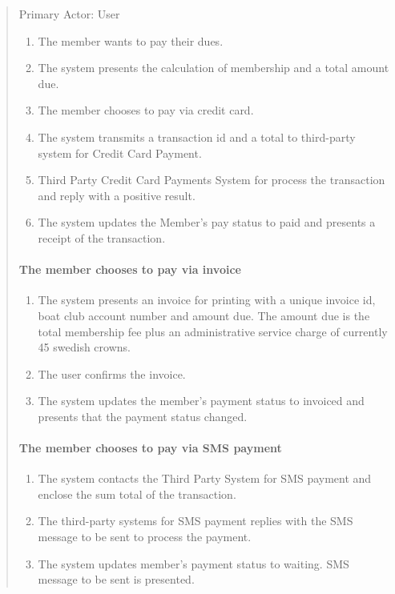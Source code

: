 \begin{quote}
Primary Actor: User


\begin{enumerate}
  \tightlist
  \item
    The member wants to pay their dues.
  \item
    The system presents the calculation of membership and a total amount due.
  \item
    The member chooses to pay via credit card.
  \item
    The system transmits a transaction id and a total to third-party system
    for Credit Card Payment.
  \item
    Third Party Credit Card Payments System for process the transaction and
    reply with a positive result.
  \item
    The system updates the Member's pay status to paid and presents a receipt
    of the transaction.
\end{enumerate}

\paragraph{The member chooses to pay via invoice}
\begin{enumerate}
  \tightlist
  \item
    The system presents an invoice for printing with a unique invoice id,
    boat club account number and amount due. The amount due is the total
    membership fee plus an administrative service charge of currently 45
    swedish crowns.
  \item
    The user confirms the invoice.
  \item
    The system updates the member's payment status to invoiced and presents
    that the payment status changed.
\end{enumerate}

\paragraph{The member chooses to pay via SMS payment}
\begin{enumerate}
  \tightlist
  \item
    The system contacts the Third Party System for SMS payment and enclose
    the sum total of the transaction.
  \item
    The third-party systems for SMS payment replies with the SMS message to
    be sent to process the payment.
  \item
    The system updates member's payment status to waiting. SMS message to be
    sent is presented.
\end{enumerate}


\end{quote}
